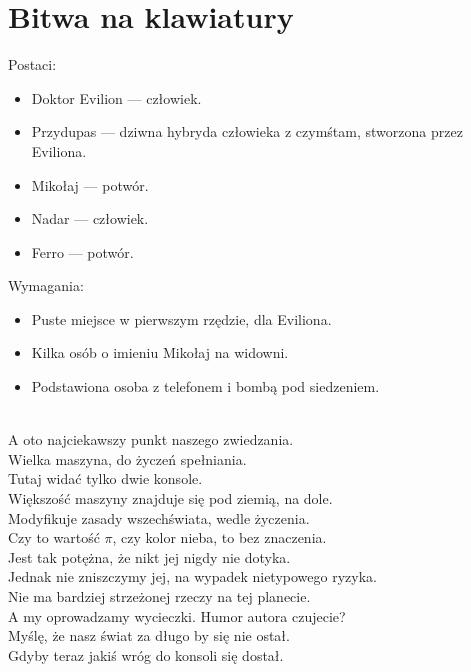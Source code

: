 \chapter{Bitwa na klawiatury} 

Postaci:
\begin{itemize}
	\item Doktor Evilion --- człowiek.
	\item Przydupas --- dziwna hybryda człowieka z czymśtam, stworzona przez Eviliona.
	\item Mikołaj --- potwór.
	\item Nadar --- człowiek.
	\item Ferro --- potwór.
\end{itemize}
Wymagania:
\begin{itemize}
	\item Puste miejsce w pierwszym rzędzie, dla Eviliona.
	\item Kilka osób o imieniu Mikołaj na widowni.
	\item Podstawiona osoba z telefonem i bombą pod siedzeniem.
\end{itemize}


\\

\charnad{}
A oto najciekawszy punkt naszego zwiedzania.\\
Wielka maszyna, do życzeń spełniania.\\
Tutaj widać tylko dwie konsole.\\
Większość maszyny znajduje się pod ziemią, na dole.\\
Modyfikuje zasady wszechświata, wedle życzenia.\\
Czy to wartość $\pi$, czy kolor nieba, to bez znaczenia.\\
Jest tak potężna, że nikt jej nigdy nie dotyka.\\
Jednak nie zniszczymy jej, na wypadek nietypowego ryzyka.\\
Nie ma bardziej strzeżonej rzeczy na tej planecie.\\
A my oprowadzamy wycieczki. Humor autora czujecie?\\
Myślę, że nasz świat za długo by się nie ostał.\\
Gdyby teraz jakiś wróg do konsoli się dostał.\\

